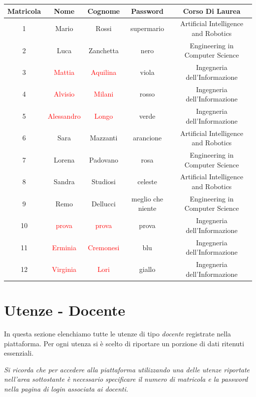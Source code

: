 \documentclass [a4paper,11pt]{book}
\begin{document}
\medskip
\medskip
\begin{tabular}{|c|c|c|c|c|}
\hline
Matricola & Nome & Cognome & Password & Corso Di Laurea\\
\hline
1 & Mario & Rossi & supermario & Artificial Intelligence and Robotics\\
\hline
2 & Luca & Zanchetta & nero & 
Engineering in Computer Science\\
\hline
3 & \textcolor{red}{Mattia} & \textcolor{red}{Aquilina} & viola & 
Ingegneria dell'Informazione\\
\hline
4 & \textcolor{red}{Alvisio} & \textcolor{red}{Milani} & rosso & 
Ingegneria dell'Informazione\\
\hline
5 & \textcolor{red}{Alessandro} & \textcolor{red}{Longo} & verde & 
Ingegneria dell'Informazione\\
\hline
6 & Sara & Mazzanti & arancione & 
Artificial Intelligence and Robotics\\
\hline
7 & Lorena & Padovano & rosa & 
Engineering in Computer Science\\
\hline
8 & Sandra & Studiosi & celeste & Artificial Intelligence and Robotics\\
\hline
9 & Remo & Dellucci & meglio che niente & 
Engineering in Computer Science\\
\hline
10 & \textcolor{red}{prova} & \textcolor{red}{prova} & prova & Ingegneria dell'Informazione\\
\hline
11& \textcolor{red}{Erminia} & \textcolor{red}{Cremonesi} & blu & Ingegneria dell'Informazione\\
\hline
12 & \textcolor{red}{Virginia} & \textcolor{red}{Lori} & giallo & 
Ingegneria dell'Informazione\\
\hline
\end{tabular}

\medskip

\section{Utenze - Docente}

In questa sezione elenchiamo tutte le utenze di tipo \emph{docente} registrate nella piattaforma. Per ogni utenza si è scelto di riportare un porzione di dati ritenuti essenziali. 

\medskip

\emph{Si ricorda che per accedere alla piattaforma utilizzando una delle utenze riportate nell'area sottostante è necessario specificare il numero di matricola e la password nella pagina di login associata ai docenti.}
\end{document}
